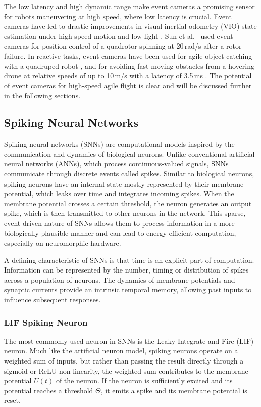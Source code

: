     The low latency and high dynamic range make event cameras a promising sensor for robots maneuvering at high speed, where low latency is crucial. Event cameras have led to drastic improvements in visual-inertial odometry (VIO) state estimation under high-speed motion and low light \cite{vidalUltimateSLAMCombining2018}. Sun et al.~\cite{sunAutonomousQuadrotorFlight2021} used event cameras for position control of a quadrotor spinning at 20\,rad/s after a rotor failure. In reactive tasks, event cameras have been used for agile object catching with a quadruped robot \cite{forraiEventbasedAgileObject2023}, and for avoiding fast-moving obstacles from a hovering drone at relative speeds of up to 10\,m/s with a latency of 3.5\,ms \cite{falangaDynamicObstacleAvoidance2020}. The potential of event cameras for high-speed agile flight is clear and will be discussed further in the following sections.

    \subsection{Spiking Neural Networks}
    Spiking neural networks (SNNs) are computational models inspired by the communication and dynamics of biological neurons. Unlike conventional artificial neural networks (ANNs), which process continuous-valued signals, SNNs communicate through discrete events called spikes. Similar to biological neurons, spiking neurons have an internal state mostly represented by their membrane potential, which leaks over time and integrates incoming spikes. When the membrane potential crosses a certain threshold, the neuron generates an output spike, which is then transmitted to other neurons in the network. This sparse, event-driven nature of SNNs allows them to process information in a more biologically plausible manner and can lead to energy-efficient computation, especially on neuromorphic hardware.

    A defining characteristic of SNNs is that time is an explicit part of computation. Information can be represented by the number, timing or distribution of spikes across a population of neurons. The dynamics of membrane potentials and synaptic currents provide an intrinsic temporal memory, allowing past inputs to influence subsequent responses.

    \subsubsection{LIF Spiking Neuron}
    The most commonly used neuron in SNNs is the Leaky Integrate-and-Fire (LIF) neuron. Much like the artificial neuron model, spiking neurons operate on a weighted sum of inputs, but rather than passing the result directly through a sigmoid or ReLU non-linearity, the weighted sum contributes to the membrane potential $U(t)$ of the neuron. If the neuron is sufficiently excited and its potential reaches a threshold $\Theta$, it emits a spike and its membrane potential is reset.

